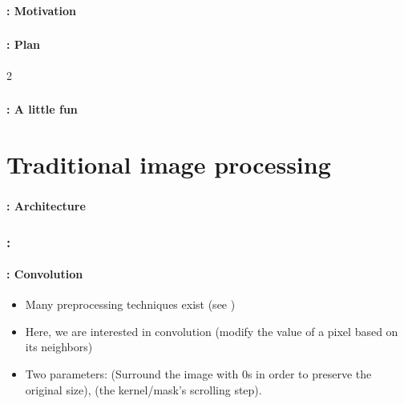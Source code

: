 \documentclass[xcolor=table]{beamer}
\subtitle[CNNs]{Convolutional Neural Networks}
\begin{document}
\begin{frame}
	\frametitle{\inserttitle}
	\framesubtitle{\insertshortsubtitle: Motivation}


\end{frame}

\begin{frame}
	\frametitle{\inserttitle}
	\framesubtitle{\insertshortsubtitle: Plan}
	
	\begin{multicols}{2}
		\tableofcontents
	\end{multicols}
\end{frame}

\begin{frame}
	\frametitle{\inserttitle}
	\framesubtitle{\insertshortsubtitle: A little fun}
	
	
\end{frame}

\section{Traditional image processing}

\begin{frame}
	
	\frametitle{\insertshortsubtitle}
	\framesubtitle{\insertsection: Architecture}
	
	\begin{center}
	\end{center}

\end{frame}

\begin{frame}
	\frametitle{\insertshortsubtitle: \insertsection}
	\framesubtitle{\insertsubsection: Convolution}
	
	\begin{itemize}
		\item Many preprocessing techniques exist (see \cite{2010-alginahi})
		\item Here, we are interested in convolution (modify the value of a pixel based on its neighbors)
		\item Two parameters:  (Surround the image with 0s in order to preserve the original size),  (the kernel/mask's scrolling step).
	\end{itemize}
	
	\begin{center}
	\end{center}

\end{frame}
\end{document}
